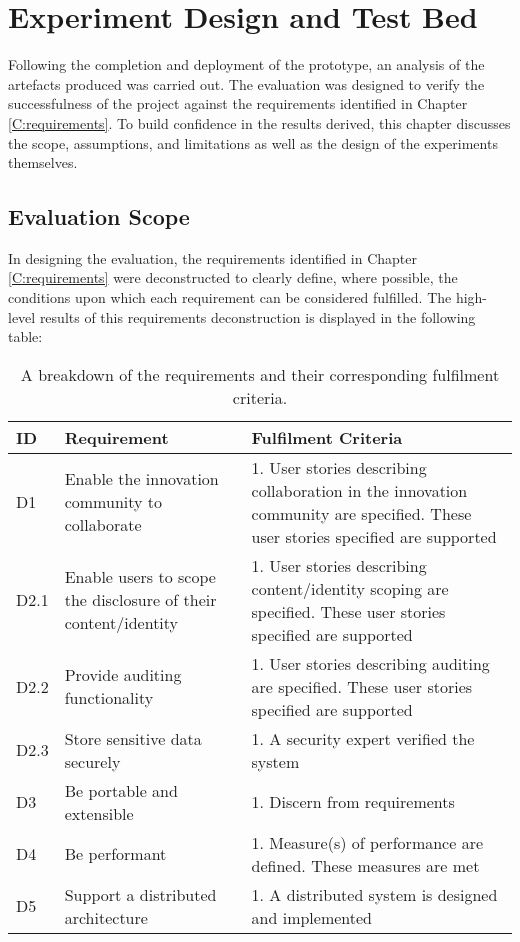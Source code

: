 \chapter{Experiment Design and Test Bed}
Following the completion and deployment of the prototype, an analysis of the artefacts produced was carried out. The evaluation was designed to verify the successfulness of the project against the requirements identified in Chapter \ref{C:requirements}. To build confidence in the results derived, this chapter discusses the scope, assumptions, and limitations as well as the design of the experiments themselves.

\section{Evaluation Scope}\label{S:evaluationScope}
In designing the evaluation, the requirements identified in Chapter \ref{C:requirements} were deconstructed to clearly define, where possible, the conditions upon which each requirement can be considered fulfilled. The high-level results of this requirements deconstruction is displayed in the following table:

\begin{table}[h!]
\begin{adjustwidth}{-1.25cm}{}
\begin{tabular}{ |p{1cm}||p{6cm}|p{10cm}|  }
 \hline
 ID & Requirement & Fulfilment Criteria\\
 \hline
    D1 & Enable the innovation community to collaborate & 1. User stories describing collaboration in the innovation 
  community are specified\newline2. These user stories specified are supported\\
 \hline
    D2.1 & Enable users to scope the disclosure of their content/identity & 1. User stories describing content/identity scoping are specified\newline2. These user stories specified are supported\\
 \hline
    D2.2 & Provide auditing functionality & 1. User stories describing auditing are specified\newline2. These user stories specified are supported\\
 \hline
    D2.3 & Store sensitive data securely & 1. A security expert verified the system\\
 \hline
    D3 & Be portable and extensible & 1. Discern from requirements\\
 \hline
    D4 & Be performant & 1. Measure(s) of performance are defined\newline2. These measures are met\\
 \hline
    D5 & Support a distributed architecture & 1. A distributed system is designed and implemented\\
 \hline
\end{tabular}
\caption{A breakdown of the requirements and their corresponding fulfilment criteria.}
\label{Table:innovation_breakdown}
\end{adjustwidth}
\end{table}
\vspace{1em}

